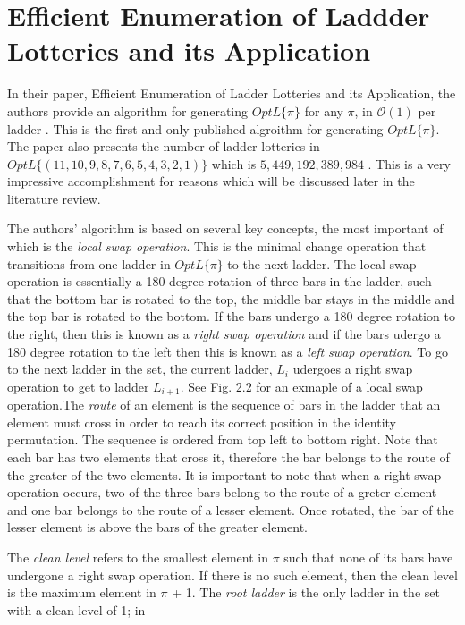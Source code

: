 \section{Efficient Enumeration of Laddder Lotteries and its Application}
In their paper, Efficient Enumeration of Ladder Lotteries and its Application,
the authors provide an algorithm for generating $OptL\{\pi\}$ 
for any $\pi$, in $\mathcal{O}(1)$ per ladder \cite{A1}. This is the first and only 
published algroithm for generating $OptL\{\pi\}$. The paper also presents the number 
of ladder lotteries in $OptL\{(11, 10, 9, 8, 7, 6, 5, 4, 3, 2, 1)\}$ which is 
$5,449,192,389,984$ \cite{A1}. This is a very impressive accomplishment for reasons which 
will be discussed later in the literature review.\par 
The authors' algorithm is based on several key concepts, the most 
important of which is the \emph{local swap operation}. This is the 
minimal change operation that transitions from one ladder in $OptL\{\pi\}$ to the 
next ladder. The local swap operation is essentially a 180 degree rotation
of three bars in the ladder, such that the bottom
bar is rotated to the top, the middle bar stays in the middle and the top bar
is rotated to the bottom. If the bars undergo a 180 degree rotation to the right, 
then this is known as a \emph{right swap operation} and 
if the bars udergo a 180 degree rotation to the left then this 
is known as a \emph{left swap operation}. To go to the next ladder in the set, 
the current ladder, $L_{i}$ udergoes a right swap operation 
to get to ladder $L_{i+1}$. See Fig. 2.2 for an exmaple of a 
local swap operation.The \emph{route} of an element is the sequence of bars in the ladder that an element must cross in order to reach its correct position in 
the identity permutation. The sequence is ordered from top left to bottom right.
Note that each bar has two elements that cross it, 
therefore the bar belongs to the route of the greater of the two elements. 
It is important to note that when a right swap operation occurs, 
two of the three bars belong to the route of a greter element and one bar belongs
to the route of a lesser element. Once rotated, the bar of the lesser element is 
above the bars of the greater element.\par
The \emph{clean level} refers to the smallest element 
in $\pi$ such that none of its bars have undergone a right swap operation.
If there is no such element, then the clean level is the maximum element in $\pi$ + 1.
The \emph{root ladder} is the only ladder in  the set with a clean level of 1; in 
